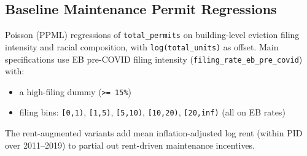 \documentclass[
  11pt,
]{article}
\providecommand{\tightlist}{%
  \setlength{\itemsep}{0pt}\setlength{\parskip}{0pt}}
\begin{document}
\subsection{Baseline Maintenance Permit
Regressions}\label{baseline-maintenance-permit-regressions}

Poisson (PPML) regressions of \texttt{total\_permits} on building-level
eviction filing intensity and racial composition, with
\texttt{log(total\_units)} as offset. Main specifications use EB
pre-COVID filing intensity (\texttt{filing\_rate\_eb\_pre\_covid}) with:

\begin{itemize}
\tightlist
\item
  a high-filing dummy (\texttt{\textgreater{}=\ 15\%})
\item
  filing bins: \texttt{{[}0,1)}, \texttt{{[}1,5)}, \texttt{{[}5,10)},
  \texttt{{[}10,20)}, \texttt{{[}20,inf)} (all on EB rates)
\end{itemize}

The rent-augmented variants add mean inflation-adjusted log rent (within
PID over 2011--2019) to partial out rent-driven maintenance incentives.
\end{document}
